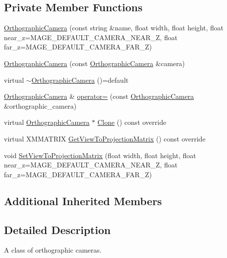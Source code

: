 \subsection*{Private Member Functions}
\begin{DoxyCompactItemize}
\item 
\hyperlink{classmage_1_1_orthographic_camera_a7d8b48144b0ef2e2f0aa4f06f3858abd}{Orthographic\+Camera} (const string \&name, float width, float height, float near\+\_\+z=M\+A\+G\+E\+\_\+\+D\+E\+F\+A\+U\+L\+T\+\_\+\+C\+A\+M\+E\+R\+A\+\_\+\+N\+E\+A\+R\+\_\+Z, float far\+\_\+z=M\+A\+G\+E\+\_\+\+D\+E\+F\+A\+U\+L\+T\+\_\+\+C\+A\+M\+E\+R\+A\+\_\+\+F\+A\+R\+\_\+Z)
\item 
\hyperlink{classmage_1_1_orthographic_camera_aad12a2901577a187bb53e4c2e2f5a658}{Orthographic\+Camera} (const \hyperlink{classmage_1_1_orthographic_camera}{Orthographic\+Camera} \&camera)
\item 
virtual \hyperlink{classmage_1_1_orthographic_camera_abdad923634e17f217ba975a9149f6c57}{$\sim$\+Orthographic\+Camera} ()=default
\item 
\hyperlink{classmage_1_1_orthographic_camera}{Orthographic\+Camera} \& \hyperlink{classmage_1_1_orthographic_camera_a8ea679c9b4c3d2c6aef40119dbf60921}{operator=} (const \hyperlink{classmage_1_1_orthographic_camera}{Orthographic\+Camera} \&orthographic\+\_\+camera)
\item 
virtual \hyperlink{classmage_1_1_orthographic_camera}{Orthographic\+Camera} $\ast$ \hyperlink{classmage_1_1_orthographic_camera_ae075c08e4af88f74212bf5c84d2e5b2a}{Clone} () const override
\item 
virtual X\+M\+M\+A\+T\+R\+IX \hyperlink{classmage_1_1_orthographic_camera_aedd86e56a0f7bc967ad8d9be2631a0cf}{Get\+View\+To\+Projection\+Matrix} () const override
\item 
void \hyperlink{classmage_1_1_orthographic_camera_a1ff2b3e4467049b978155d652a687c2d}{Set\+View\+To\+Projection\+Matrix} (float width, float height, float near\+\_\+z=M\+A\+G\+E\+\_\+\+D\+E\+F\+A\+U\+L\+T\+\_\+\+C\+A\+M\+E\+R\+A\+\_\+\+N\+E\+A\+R\+\_\+Z, float far\+\_\+z=M\+A\+G\+E\+\_\+\+D\+E\+F\+A\+U\+L\+T\+\_\+\+C\+A\+M\+E\+R\+A\+\_\+\+F\+A\+R\+\_\+Z)
\end{DoxyCompactItemize}
\subsection*{Additional Inherited Members}


\subsection{Detailed Description}
A class of orthographic cameras. 

